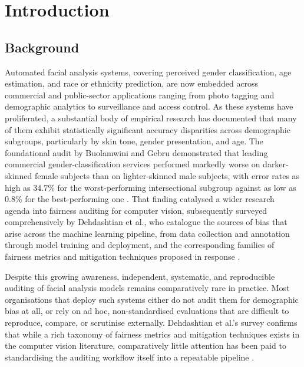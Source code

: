 \chapter{Introduction}
\label{chap:intro}

\section{Background}

Automated facial analysis systems, covering perceived gender classification, age estimation, and race or ethnicity prediction, are now embedded across commercial and public-sector applications ranging from photo tagging and demographic analytics to surveillance and access control. As these systems have proliferated, a substantial body of empirical research has documented that many of them exhibit statistically significant accuracy disparities across demographic subgroups, particularly by skin tone, gender presentation, and age. The foundational audit by Buolamwini and Gebru demonstrated that leading commercial gender-classification services performed markedly worse on darker-skinned female subjects than on lighter-skinned male subjects, with error rates as high as 34.7\% for the worst-performing intersectional subgroup against as low as 0.8\% for the best-performing one \cite{buolamwini2018gendershades}. That finding catalysed a wider research agenda into fairness auditing for computer vision, subsequently surveyed comprehensively by Dehdashtian et al., who catalogue the sources of bias that arise across the machine learning pipeline, from data collection and annotation through model training and deployment, and the corresponding families of fairness metrics and mitigation techniques proposed in response \cite{dehdashtian2024survey}.

Despite this growing awareness, independent, systematic, and reproducible auditing of facial analysis models remains comparatively rare in practice. Most organisations that deploy such systems either do not audit them for demographic bias at all, or rely on ad hoc, non-standardised evaluations that are difficult to reproduce, compare, or scrutinise externally. Dehdashtian et al.'s survey confirms that while a rich taxonomy of fairness metrics and mitigation techniques exists in the computer vision literature, comparatively little attention has been paid to standardising the auditing workflow itself into a repeatable pipeline \cite{dehdashtian2024survey}.

